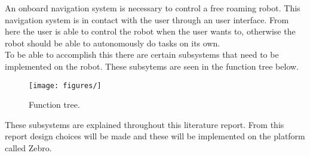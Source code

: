 \documentclass{article}
\begin{document}
An onboard navigation system is necessary to control a free roaming robot. This navigation system is in contact with the user through an user interface. From here the user is able to control the robot when the user wants to, otherwise the robot should be able to autonomously do tasks on its own.\\
To be able to accomplish this there are certain subsystems that need to be implemented on the robot. These subsytems are seen in the function tree below.

\begin{figure}[H]
	\centering
	\texttt{[image: figures/]}
	\caption{Function tree.}
	\label{intro1}
\end{figure}

These subsystems are explained throughout this literature report. From this report design choices will be made and these will be implemented on the platform called Zebro. 
\end{document}

